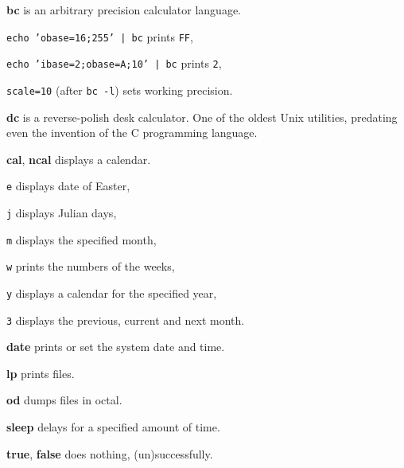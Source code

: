\begin{enumx}
\item [\cmd] \textbf{bc} is an arbitrary precision calculator language.
\item \texttt{echo 'obase=16;255' | bc} prints \texttt{FF},
\item \texttt{echo 'ibase=2;obase=A;10' | bc} prints \texttt{2},
\item \texttt{scale=10} (after \texttt{bc -l}) sets working precision.
\item [\cmd] \textbf{dc} is a reverse-polish desk calculator.
One of the oldest Unix utilities, 
predating even the invention of the C programming language.
\item [\cmd] \textbf{cal}, \textbf{ncal} displays a calendar.
\item [\texttt{e}] displays date of Easter,
\item [\texttt{j}] displays Julian days,
\item [\texttt{m}] displays the specified month,
\item [\texttt{w}] prints the numbers of the weeks,
\item [\texttt{y}] displays a calendar for the specified year,
\item [\texttt{3}] displays the previous, current and next month.
\item [\cmd] \textbf{date} prints or set the system date and time.
\item [\cmd] \textbf{lp} prints files.
\item [\cmd] \textbf{od} dumps files in octal.
\item [\cmd] \textbf{sleep} delays for a specified amount of time.
\item [\cmd] \textbf{true}, \textbf{false} does nothing, (un)successfully.
\end{enumx}
